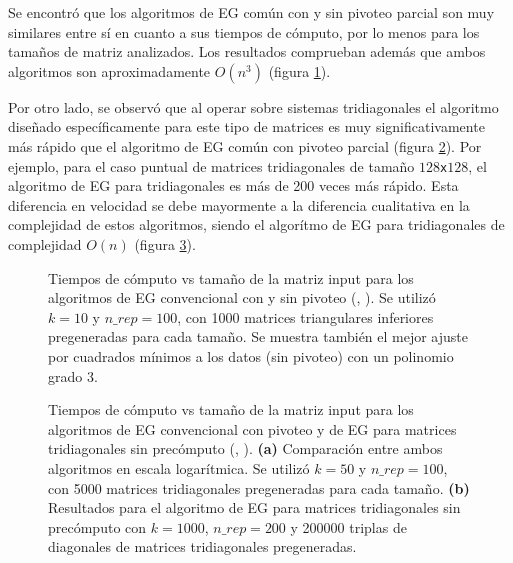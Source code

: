Se encontró que los algoritmos de EG común con y sin pivoteo parcial son muy similares entre sí en cuanto a sus tiempos de cómputo, por lo menos para los tamaños de matriz analizados. Los resultados comprueban además que ambos algoritmos son aproximadamente $O(n^3)$ (figura \ref{fig:EG_sin_vs_con_pivoteo}).

Por otro lado, se observó que al operar sobre sistemas tridiagonales el algoritmo diseñado específicamente para este tipo de matrices es muy significativamente más rápido que el algoritmo de EG común con pivoteo parcial (figura \ref{fig:EG_con_pivoteo_vs_tridiagonales}). Por ejemplo, para el caso puntual de matrices tridiagonales de tamaño $128$\texttt{x}$128$, el algoritmo de EG para tridiagonales es más de 200 veces más rápido. Esta diferencia en velocidad se debe mayormente a la diferencia cualitativa en la complejidad de estos algoritmos, siendo el algorítmo de EG para tridiagonales de complejidad $O(n)$ (figura \ref{fig:EG_tridiagonales_solo}).

\clearpage
\begin{figure}[!ht]
    \centering
    \caption{Tiempos de cómputo vs tamaño de la matriz input para los algoritmos de EG convencional con y sin pivoteo (, ). Se utilizó $k=10$ y $n\_rep=100$, con 1000 matrices triangulares inferiores pregeneradas para cada tamaño. Se muestra también el mejor ajuste por cuadrados mínimos a los datos (sin pivoteo) con un polinomio grado 3.}
    \label{fig:EG_sin_vs_con_pivoteo}
\end{figure}

\begin{figure}[!ht]
    \centering
    \begin{subfigure}[b]{0.475\textwidth}
        \centering
        
        \caption{}
        \label{fig:EG_con_pivoteo_vs_tridiagonales}
    \end{subfigure}
    \hfill
    \begin{subfigure}[b]{0.45\textwidth}
        \centering
        
        \caption{}
        \label{fig:EG_tridiagonales_solo}
    \end{subfigure}
    \caption{Tiempos de cómputo vs tamaño de la matriz input para los algoritmos de EG convencional con pivoteo y de EG para matrices tridiagonales sin precómputo (, ). \textbf{(a)} Comparación entre ambos algoritmos en escala logarítmica. Se utilizó $k=50$ y $n\_rep=100$, con 5000 matrices tridiagonales pregeneradas para cada tamaño. \textbf{(b)} Resultados para el algoritmo de EG para matrices tridiagonales sin precómputo con $k=1000$, $n\_rep=200$ y 200000 triplas de diagonales de matrices tridiagonales pregeneradas.}
    \label{fig:EG_tridiagonales}
\end{figure}

